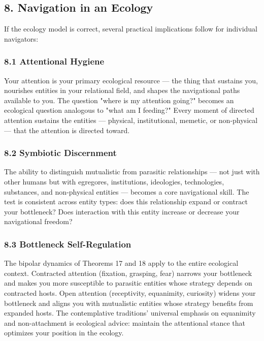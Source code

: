 \subsection*{8. Navigation in an Ecology}


If the ecology model is correct, several practical implications follow for individual navigators:


\subsubsection*{8.1 Attentional Hygiene}


Your attention is your primary ecological resource — the thing that sustains you, nourishes entities in your relational field, and shapes the navigational paths available to you. The question "where is my attention going?" becomes an ecological question analogous to "what am I feeding?" Every moment of directed attention sustains the entities — physical, institutional, memetic, or non-physical — that the attention is directed toward.


\subsubsection*{8.2 Symbiotic Discernment}


The ability to distinguish mutualistic from parasitic relationships — not just with other humans but with egregores, institutions, ideologies, technologies, substances, and non-physical entities — becomes a core navigational skill. The test is consistent across entity types: does this relationship expand or contract your bottleneck? Does interaction with this entity increase or decrease your navigational freedom?


\subsubsection*{8.3 Bottleneck Self-Regulation}


The bipolar dynamics of Theorems 17 and 18 apply to the entire ecological context. Contracted attention (fixation, grasping, fear) narrows your bottleneck and makes you more susceptible to parasitic entities whose strategy depends on contracted hosts. Open attention (receptivity, equanimity, curiosity) widens your bottleneck and aligns you with mutualistic entities whose strategy benefits from expanded hosts. The contemplative traditions' universal emphasis on equanimity and non-attachment is ecological advice: maintain the attentional stance that optimizes your position in the ecology.


